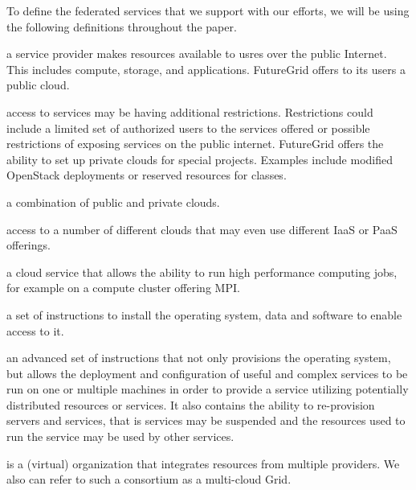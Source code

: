 \documentclass{tex/sig-alternate-2013}
\begin{document}
To define the federated services that we support with our efforts, we will be
using the following definitions throughout the paper.

\begin{description}
   \setlength{\itemsep}{0pt}
   \setlength{\parsep}{0pt}

\item[public-cloud:]  a service provider makes resources available to
  usres over the public Internet. This includes compute, storage, and
  applications. FutureGrid offers to its users a public cloud. 

\item[private-cloud:] access to services may be having additional
  restrictions. Restrictions could include a limited set of authorized
  users to the services offered or  possible restrictions of exposing services on the public
  internet. FutureGrid offers the ability to set up private clouds for
  special projects. Examples include modified OpenStack deployments or
  reserved resources for classes.

\item[hybrid-cloud:] a combination of public and private clouds. 

\item[multi-cloud:] access to a number of different clouds that may
  even use different IaaS or PaaS offerings. 

\item[hpc-service:] a cloud service that allows the ability to run high
  performance computing jobs, for example on a compute cluster
  offering MPI. 

\item[provisioning:] a set of instructions to install the operating
  system, data and software to enable access to it. 

\item[rain:] an advanced set of instructions that not only provisions
  the operating system, but allows the deployment and configuration of
  useful and complex services to be run on one or multiple machines in
  order to provide a service utilizing potentially distributed
  resources or services.  It also contains the ability to re-provision
  servers and services, that is services may be suspended and the
  resources used to run the service may be used by other services.

\item[provider consortium:] is a (virtual) organization that
  integrates resources from multiple providers. We also can refer to
  such a consortium as a multi-cloud Grid.

\end{description}
\end{document}
